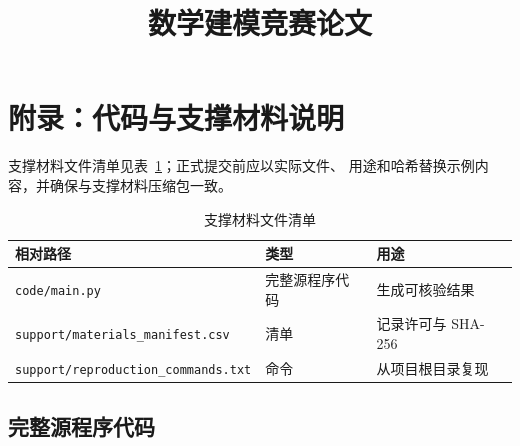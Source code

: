 \documentclass[UTF8,fontset=fandol,zihao=-4]{ctexart}
\title{数学建模竞赛论文}
\author{}
\date{}
\begin{document}
\maketitle









  {}
  {}


\appendix
\section{附录：代码与支撑材料说明}

支撑材料文件清单见表~\ref{tab:support-manifest}；正式提交前应以实际文件、
用途和哈希替换示例内容，并确保与支撑材料压缩包一致。

\begin{table}[htbp]
  \centering
  \caption{支撑材料文件清单}
  \label{tab:support-manifest}
  \begin{tabular}{lll}
    \toprule
    相对路径 & 类型 & 用途 \\
    \midrule
    \texttt{code/main.py} & 完整源程序代码 & 生成可核验结果 \\
    \texttt{support/materials\_manifest.csv} & 清单 & 记录许可与 SHA-256 \\
    \texttt{support/reproduction\_commands.txt} & 命令 & 从项目根目录复现 \\
    \bottomrule
  \end{tabular}
\end{table}

\subsection{完整源程序代码}

\lstset{
  basicstyle=\ttfamily\small,
  frame=single,
  breaklines=true,
  showstringspaces=false
}

\end{document}
